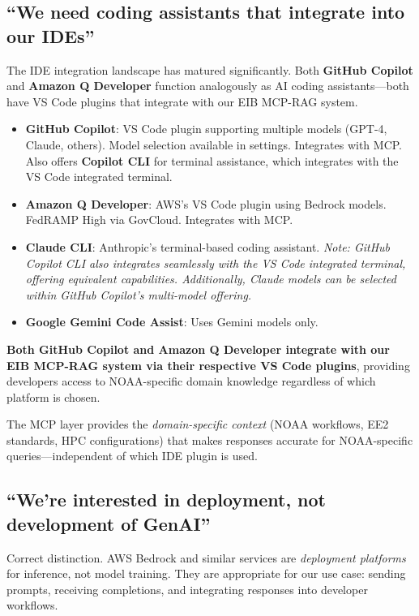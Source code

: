 \documentclass[11pt]{article}
\begin{document}
\subsection*{``We need coding assistants that integrate into our IDEs''}
The IDE integration landscape has matured significantly. Both \textbf{GitHub Copilot} and \textbf{Amazon Q Developer} function analogously as AI coding assistants---both have VS Code plugins that integrate with our EIB MCP-RAG system.

\begin{itemize}[itemsep=2pt]
    \item \textbf{GitHub Copilot}: VS Code plugin supporting multiple models (GPT-4, Claude, others). Model selection available in settings. Integrates with MCP\@. Also offers \textbf{Copilot CLI} for terminal assistance, which integrates with the VS Code integrated terminal.
    \item \textbf{Amazon Q Developer}: AWS's VS Code plugin using Bedrock models. FedRAMP High via GovCloud. Integrates with MCP\@.
    \item \textbf{Claude CLI}: Anthropic's terminal-based coding assistant. \textit{Note: GitHub Copilot CLI also integrates seamlessly with the VS Code integrated terminal, offering equivalent capabilities. Additionally, Claude models can be selected within GitHub Copilot's multi-model offering.}
    \item \textbf{Google Gemini Code Assist}: Uses Gemini models only.
\end{itemize}

\noindent\textbf{Both GitHub Copilot and Amazon Q Developer integrate with our EIB MCP-RAG system via their respective VS Code plugins}, providing developers access to NOAA-specific domain knowledge regardless of which platform is chosen.

\begin{center}
\end{center}

The MCP layer provides the \textit{domain-specific context} (NOAA workflows, EE2 standards, HPC configurations) that makes responses accurate for NOAA-specific queries---independent of which IDE plugin is used.

\subsection*{``We're interested in deployment, not development of GenAI''}
Correct distinction. AWS Bedrock and similar services are \textit{deployment platforms} for inference, not model training. They are appropriate for our use case: sending prompts, receiving completions, and integrating responses into developer workflows.
\end{document}
